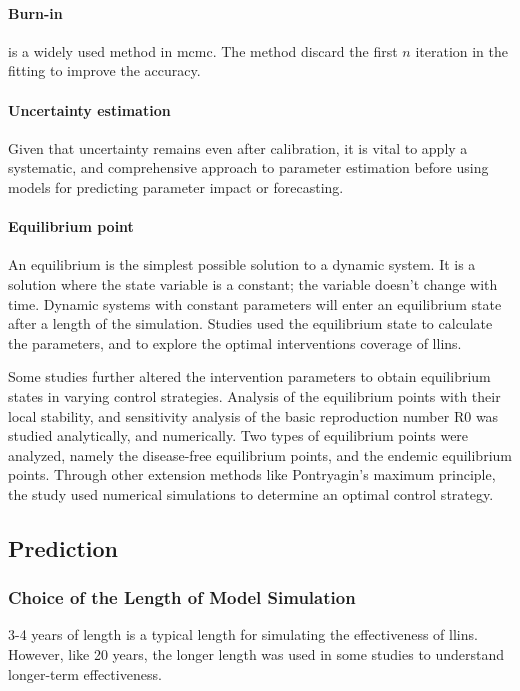 \documentclass[a4paper, 12pt, twoside]{article}
\begin{document}
\paragraph{Burn-in}%
\label{par:burn_in}
is a widely used method in \gls{mcmc}.
The method discard the first $n$ iteration in the fitting to improve the accuracy.

\paragraph{Uncertainty estimation}
Given that uncertainty remains even after calibration, it is vital to apply a systematic, and comprehensive approach to parameter estimation before using models for predicting parameter impact or forecasting.

\paragraph{Equilibrium point}%
\label{par:equilibrium_point}
An equilibrium is the simplest possible solution to a dynamic system.
It is a solution where the state variable is a constant; the variable doesn't change with time.
Dynamic systems with constant parameters will enter an equilibrium state after a length of the simulation.
Studies\cite{Handari2020, Nwankwo2019,NiazArifin2013,Heesterbeek2015a,Karl2016,Olaniyi2020,Stuckey2014,Tompkins2013,Tompkins2013,Mbogo2018,Winskill2019,Smith2019,Briet2013} used the equilibrium state to calculate the parameters, and to explore the optimal interventions coverage of \gls{llins}.

Some studies further altered the intervention parameters to obtain equilibrium states in varying control strategies.
Analysis of the equilibrium points with their local stability, and sensitivity analysis of the basic reproduction number \gls{R0} was studied analytically, and numerically.
Two types of equilibrium points were analyzed, namely the disease-free equilibrium points, and the endemic equilibrium points.
Through other extension methods like Pontryagin’s maximum principle, the study used numerical simulations to determine an optimal control strategy\cite{Tchoumi2020}.

\subsection{Prediction}%
\label{sub:prediction}

\subsubsection{Choice of the Length of Model Simulation}
3-4 years of length is a typical length for simulating the effectiveness of \gls{llins}.
However, like 20 years, the longer length was used in some studies to understand longer-term effectiveness\cite{Walker2016}.
\end{document}
